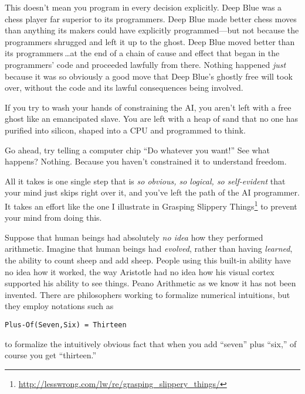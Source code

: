  This doesn't mean you program in every decision
explicitly. Deep Blue was a chess player far superior to its
programmers. Deep Blue made better chess moves than anything its makers
could have explicitly programmed---but not because the programmers
shrugged and left it up to the ghost. Deep Blue moved better than its
programmers\,\ldots at the end of a chain of cause and effect that began
in the programmers' code and proceeded lawfully from
there. Nothing happened \textit{just} because it was so obviously a
good move that Deep Blue's ghostly free will took over,
without the code and its lawful consequences being involved.


 If you try to wash your hands of constraining the AI, you
aren't left with a free ghost like an emancipated
slave. You are left with a heap of sand that no one has purified into
silicon, shaped into a CPU and programmed to think.


 Go ahead, try telling a computer chip ``Do
whatever you want!'' See what happens? Nothing.
Because you haven't constrained it to understand
freedom.


 All it takes is one single step that is \textit{so obvious, so
logical, so self-evident} that your mind just skips right over it, and
you've left the path of the AI programmer. It takes an
effort like the one I illustrate in Grasping Slippery Things\footnote{\url{http://lesswrong.com/lw/re/grasping_slippery_things/}} to prevent
your mind from doing this.

\myendsectiontext



 Suppose that human beings had absolutely \textit{no idea} how they
performed arithmetic. Imagine that human beings had \textit{evolved},
rather than having \textit{learned}, the ability to count sheep and add
sheep. People using this built-in ability have no idea how it worked,
the way Aristotle had no idea how his visual cortex supported his
ability to see things. Peano Arithmetic as we know it has not been
invented. There are philosophers working to formalize numerical
intuitions, but they employ notations such as

\begin{center}
\texttt{Plus-Of(Seven,Six) = Thirteen}
\end{center}


 to formalize the intuitively obvious fact that when you add
``seven'' plus
``six,'' of course you get
``thirteen.'' 


